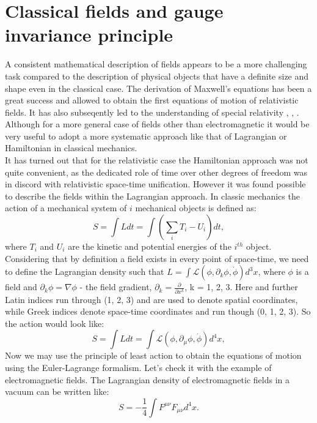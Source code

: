 \section{Classical fields and gauge invariance principle}
\label{sec::gauge}
A consistent mathematical description of fields appears to be a more challenging task compared to the description of physical objects that have a definite size and shape even in the classical case. The derivation of Maxwell's equations has been a great success and allowed to obtain the first equations of motion of relativistic fields. It has also subseqently led to the understanding of special relativity \cite{einstein}, \cite{poincare}, \cite{lorentz}. Although for a more general case of fields other than electromagnetic it would be very useful to adopt a more systematic approach like that of Lagrangian or Hamiltonian in classical mechanics. \\
It has turned out that for the relativistic case the Hamiltonian approach was not quite convenient, as the dedicated role of time over other degrees of freedom was in discord with relativistic space-time unification. However it was found possible to describe the fields within the Lagrangian approach. In classic mechanics the action of a mechanical system of $i$ mechanical objects is defined as:
 \begin{equation}
\nonumber
S = \int Ldt = \int \left( \sum_i T_i - U_i \right) dt,
\end{equation}
where $T_i$ and $U_i$ are the kinetic and potential energies of the $i^{th}$ object. Considering that by definition a field exists in every point of space-time, we need to define the Lagrangian density such that $L = \int \mathcal{L}(\phi,\partial_{k}\phi,\dot\phi ) d^3x$, where $\phi$ is a field and $\partial_{k}\phi = \nabla\phi$ - the field gradient, $\partial_{k} = \frac{\partial}{\partial x^{k}}$,  k = 1, 2, 3. Here and further Latin indices run through (1, 2, 3) and are used to denote spatial coordinates, while Greek indices denote space-time coordinates and run though (0, 1, 2, 3). So the action would look like: 
 \begin{equation}
S = \int Ldt =\int \mathcal{L}(\phi,\partial_{\mu}\phi,\dot\phi ) d^4x,
\end{equation}
Now we may use the principle of least action to obtain the equations of motion using the Euler-Lagrange formalism. Let's check it with the example of electromagnetic fields. The Lagrangian density of electromagnetic fields in a vacuum can be written like:
 \begin{equation}
S = -\frac{1}{4}\int F^{\mu \nu}F_{\mu \nu}d^4x.
\end{equation}
